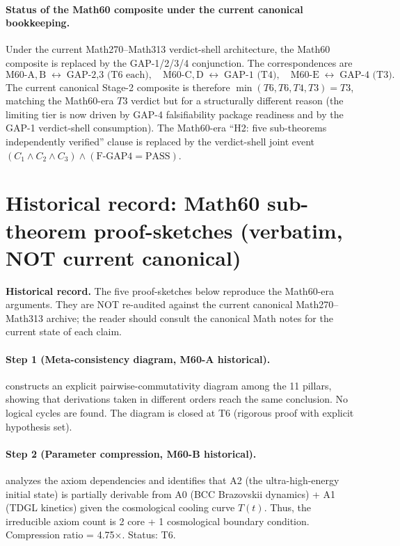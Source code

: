 \paragraph{Status of the Math60 composite under the current
canonical bookkeeping.}
Under the current Math270--Math313 verdict-shell architecture, the
Math60 composite is replaced by the GAP-1/2/3/4 conjunction. The
correspondences are
\[
  \mathrm{M60\text{-}A,B}\;\longleftrightarrow\;\text{GAP-2,3 (T6 each)},
  \quad
  \mathrm{M60\text{-}C,D}\;\longleftrightarrow\;\text{GAP-1 (T4)},
  \quad
  \mathrm{M60\text{-}E}\;\longleftrightarrow\;\text{GAP-4 (T3)}.
\]
The current canonical Stage-2 composite is therefore $\min(T6,T6,T4,T3) = T3$,
matching the Math60-era $T3$ verdict but for a structurally different
reason (the limiting tier is now driven by GAP-4 falsifiability
package readiness and by the GAP-1 verdict-shell consumption). The
Math60-era ``H2: five sub-theorems independently verified'' clause
is replaced by the verdict-shell joint event
$(C_1 \wedge C_2 \wedge C_3) \wedge (\text{F-GAP4} = \text{PASS})$.

\section{Historical record: Math60 sub-theorem proof-sketches
(verbatim, NOT current canonical)}\label{sec:proof-sketches}

\textbf{Historical record.} The five proof-sketches below reproduce
the Math60-era arguments. They are NOT re-audited against the
current canonical Math270--Math313 archive; the reader should consult
the canonical Math notes for the current state of each claim.

\paragraph{Step 1 (Meta-consistency diagram, M60-A historical).}
\cite{Math60A} constructs an explicit pairwise-commutativity diagram among
the 11 pillars, showing that derivations taken in different orders reach
the same conclusion. No logical cycles are found. The diagram is closed
at T6 (rigorous proof with explicit hypothesis set).

\paragraph{Step 2 (Parameter compression, M60-B historical).}
\cite{Math60B} analyzes the axiom dependencies and identifies that A2
(the ultra-high-energy initial state) is partially derivable from A0
(BCC Brazovskii dynamics) + A1 (TDGL kinetics) given the cosmological
cooling curve $T(t)$. Thus, the irreducible axiom count is 2 core + 1
cosmological boundary condition. Compression ratio = 4.75×. Status: T6.

